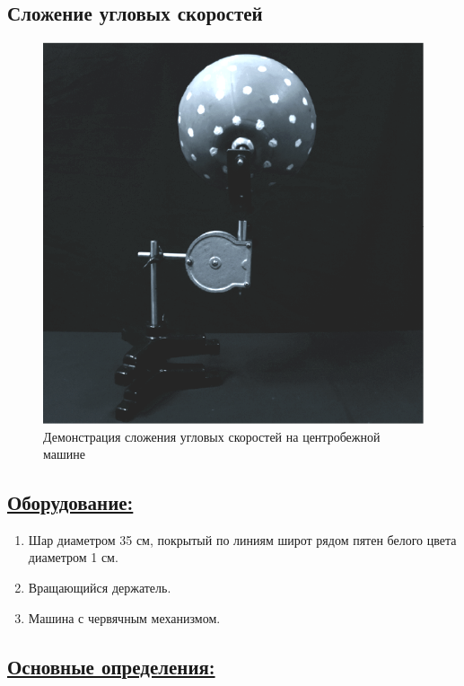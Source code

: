 \documentclass[14pt,a4paper,twoside]{extarticle}	%
\begin{document}

\newpage
\begin{center}
	\subsection*{Сложение угловых скоростей}
\end{center}

\begin{figure}[H] 
	\centering 	
	\includegraphics[width=0.6\linewidth]{angular-1.png}
	\caption{Демонстрация сложения угловых скоростей на центробежной машине}
	\label{angular-1}
\end{figure}

\subsection*{\underline{Оборудование:}}

\begin{enumerate}
	\item Шар диаметром 35 см, покрытый по линиям широт рядом пятен белого цвета диаметром 1 см.
	\item Вращающийся держатель.
	\item Машина с червячным механизмом.
\end{enumerate}

\newpage
\subsection*{\underline{Основные определения:}}
\end{document}
